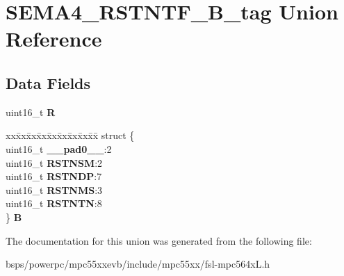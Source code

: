 \hypertarget{unionSEMA4__RSTNTF__16B__tag}{}\section{S\+E\+M\+A4\+\_\+\+R\+S\+T\+N\+T\+F\+\_\+B\+\_\+tag Union Reference}
\label{unionSEMA4__RSTNTF__16B__tag}
\subsection*{Data Fields}
\begin{DoxyCompactItemize}
\item 
\mbox{\label{unionSEMA4__RSTNTF__16B__tag_a83f8593a25a351dcc6643686468bfc43}} 
uint16\+\_\+t {\bfseries R}
\item 
\mbox{\label{unionSEMA4__RSTNTF__16B__tag_ad314964b0d48c11e8b43584b6c543a18}} 
\begin{tabbing}
xx\=xx\=xx\=xx\=xx\=xx\=xx\=xx\=xx\=\kill
struct \{\\
\>uint16\_t {\bfseries \_\_pad0\_\_}:2\\
\>uint16\_t {\bfseries RSTNSM}:2\\
\>uint16\_t {\bfseries RSTNDP}:7\\
\>uint16\_t {\bfseries RSTNMS}:3\\
\>uint16\_t {\bfseries RSTNTN}:8\\
\} {\bfseries B}\\

\end{tabbing}\end{DoxyCompactItemize}


The documentation for this union was generated from the following file\+:\begin{DoxyCompactItemize}
\item 
bsps/powerpc/mpc55xxevb/include/mpc55xx/fsl-\/mpc564x\+L.\+h\end{DoxyCompactItemize}
